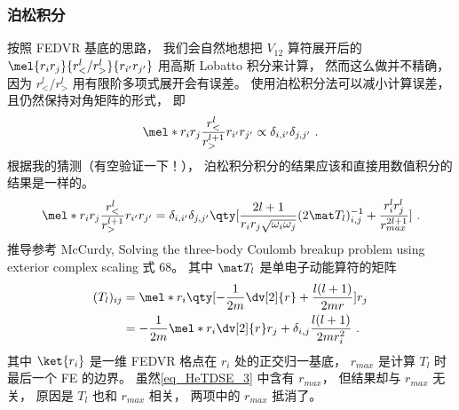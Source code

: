 \subsubsection{泊松积分}
按照 FEDVR 基底的思路， 我们会自然地想把 $V_{12}$ 算符展开后的 $\mel{r_i r_j}{r_<^l/r_>^l}{r_{i'} r_{j'}}$ 用高斯 Lobatto 积分来计算， 然而这么做并不精确， 因为 $r_<^l/r_>^l$ 用有限阶多项式展开会有误差。 使用泊松积分法可以减小计算误差， 且仍然保持对角矩阵的形式， 即
\begin{equation}
\mel*{r_i r_j}{\frac{r_<^l}{r_>^{l+1}}}{r_{i'} r_{j'}} \propto \delta_{i,i'} \delta_{j,j'}~.
\end{equation}
根据我的猜测（有空验证一下！）， 泊松积分积分的结果应该和直接用数值积分的结果是一样的。
\begin{equation}\label{eq_HeTDSE_3}
\mel*{r_i r_j}{\frac{r_<^l}{r_>^{l+1}}}{r_{i'} r_{j'}} = \delta_{i,i'} \delta_{j,j'} \qty[\frac{2l+1}{r_i r_j \sqrt{\omega_i \omega_j}} (2\mat T_l)^{-1}_{i,j} + \frac{r_i^l r_j^l}{r_{max}^{2l+1}}]~.
\end{equation}
推导参考 McCurdy, Solving the three-body Coulomb breakup problem using exterior complex scaling 式 68。 其中 $\mat T_l$ 是单电子动能算符的矩阵
\begin{equation}
\begin{aligned}
(T_l)_{ij} &= \mel*{r_i}{\qty[-\frac{1}{2m}\dv[2]{r} + \frac{l(l+1)}{2mr}]}{r_j}\\
&= -\frac{1}{2m} \mel*{r_i}{\dv[2]{r}}{r_j} + \delta_{i,j}\frac{l(l+1)}{2mr_i^2}~.
\end{aligned}
\end{equation}
其中 $\ket{r_i}$ 是一维 FEDVR 格点在 $r_i$ 处的正交归一基底， $r_{max}$ 是计算 $T_l$ 时最后一个 FE 的边界。 虽然\autoref{eq_HeTDSE_3} 中含有 $r_{max}$， 但结果却与 $r_{max}$ 无关， 原因是 $T_l$ 也和 $r_{max}$ 相关， 两项中的 $r_{max}$ 抵消了。

